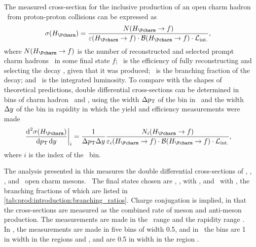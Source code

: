 The measured cross-section for the inclusive production of an open charm hadron 
\PHc\ from proton-proton collisions can be expressed as
\begin{equation}
  \xsec(\PHc) = \frac{%
    N(\HcTof)
  }{%
    \eff(\HcTof)\cdot\bfrac(\HcTof)\cdot\intlumi
  },
  \label{eqn:prod:introduction:cross_section}
\end{equation}
where $N(\HcTof)$ is the number of reconstructed and selected prompt charm 
hadrons \PHc\ in some final state $f$; \eff\ is the efficiency of fully 
reconstructing and selecting the decay \HcTof, given that it was produced; 
\bfrac\ is the branching fraction of the decay; and \intlumi\ is the integrated 
luminosity.
To compare with the shapes of theoretical predictions, double differential 
cross-sections can be determined in bins of charm hadron \pT\ and \rapidity, 
using the width $\Delta p_{\textnormal{T}}$ of the bin in \pT\ and the width $\Delta y$ 
of the bin in rapidity in which the yield and efficiency measurements were made
\begin{equation}
  \left.\frac{\dif^{2}{\xsec(\PHc)}}{\dif{\pT}\dif{\rapidity}}\right\rvert_{i}
    = \frac{1}{\Delta\pT\Delta\rapidity}
      \frac{%
        N_{i}(\HcTof)
      }{%
        \eff_{i}(\HcTof)\cdot\bfrac(\HcTof)\cdot\intlumi
      },
  \label{eqn:prod:introduction:differential_cross_section}
\end{equation}
where $i$ is the index of the \pTy\ bin.

The analysis presented in this  measures the double 
differential cross-sections of \PDzero, \PDp, \PDsplus, and \PDstarp\ open 
charm mesons.\footnotemark\
%
The final states chosen are \DzToKpi, \DpToKpipi, \DspTophipi with \phiToKK, 
and \DstToDzpi\ with \DzToKpi, the branching fractions of which are listed in 
\cref{tab:prod:introduction:branching_ratios}.
Charge conjugation is implied, in that the cross-sections are measured as the 
combined rate of meson and anti-meson production.
The measurements are made in the \pT\ range  and the rapidity 
range \yrange{2}{4.5}.
In \rapidity, the measurements are made in five bins of width 0.5, and in \pT\ 
the bins are \SI{1}{\GeVc} in width in the regions  and 
\pTrange{4}{15}, and are \SI{0.5}{\GeVc} in width in the region \pTrange{1}{4}.

